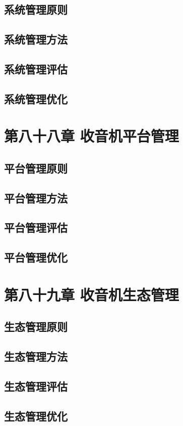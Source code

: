 \documentclass[12pt,UTF8]{ctexbook}
\begin{document}
\section{系统管理原则}
\section{系统管理方法}
\section{系统管理评估}
\section{系统管理优化}

\chapter{第八十八章 收音机平台管理}

\section{平台管理原则}
\section{平台管理方法}
\section{平台管理评估}
\section{平台管理优化}

\chapter{第八十九章 收音机生态管理}

\section{生态管理原则}
\section{生态管理方法}
\section{生态管理评估}
\section{生态管理优化}
\end{document}
